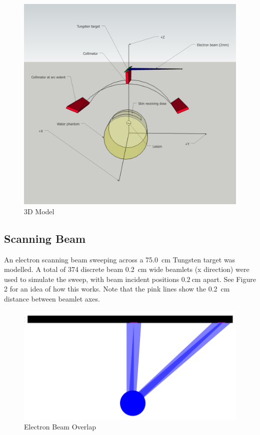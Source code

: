 \documentclass[12pt]{article}
\begin{document}
\begin{figure}[H]
\centering
\includegraphics[scale=0.3]{../conceptual-diagram.png}
\caption{3D Model}
\end{figure}

\subsection*{Scanning Beam}
An electron scanning beam sweeping across a \SI{75.0}{\cm} Tungsten target was modelled. A total of 374 discrete beam \SI{0.2}{\cm} wide beamlets (x direction) were used to simulate the sweep, with beam incident positions $\SI{0.2}{\cm}$ apart. See Figure 2 for an idea of how this works. Note that the pink lines show the \SI{0.2}{\cm} distance between beamlet axes.

\begin{figure}[H]
\centering
\includegraphics[scale=0.3]{../beam-geometry.png}
\caption{Electron Beam Overlap}
\end{figure}
\end{document}
